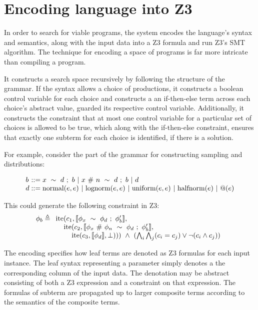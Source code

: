 \documentclass[letterpaper]{llncs}
\begin{document}
\section{Encoding language into Z3}
In order to search for viable programs, the system encodes the language's syntax and semantics, 
along with the input data into a Z3 formula and run Z3's SMT algorithm.
The technique for encoding a space of programs is far more intricate than compiling a program.

It constructs a search space recursively by following the structure of the grammar. 
If the syntax allows a choice of productions, it constructs a boolean control variable for each choice
and constructs a an if-then-else term across each choice's abstract value, guarded its respective control variable. 
Additionally, it constructs the constraint that at most one control variable for a particular set of choices    
is allowed to be true, which along with the if-then-else constraint, ensures
that exactly one subterm for each choice is identified, if there is a solution.  

For example, consider the part of the grammar for constructing sampling and distributions:

\[
  \begin{array}{l @{} l}
    b &{} ::= x\ \sim\ d\ ;\ b \ |\ x\ \#\ n\ \sim\ d\ ;\ b \ |\ d \\ 
    d &{} ::= 
        \text{normal}(e, e) \ |\ 
        \text{lognorm}(e, e) \ |\ 
        \text{uniform}(e, e) \ |\ 
        \text{halfnorm}(e) \ |\ 
        @(e) \\ 
  \end{array}
\]

This could generate the following constraint in Z3:
\[
  \phi_b \triangleq
  \begin{array}[t]{l}
  \text{ite}(c_1, \llbracket \phi_x\ \sim\ \phi_d\ ;\ \phi_b'  \rrbracket, \\
    \hspace{4mm}\text{ite}(c_2, \llbracket \phi_x\ \#\ \phi_n\ \sim\ \phi_d\ ;\ \phi_b' \rrbracket, \\
        \hspace{8mm}\text{ite}(c_3, \llbracket \phi_d \rrbracket, \bot)))
  \ \wedge\ (\bigwedge\nolimits_i \bigwedge\nolimits_j (c_i = c_j) \vee \neg (c_i \wedge c_j) )
  \end{array}
\]


The encoding specifies how leaf terms are denoted as Z3 formulas for each input instance.
The leaf syntax representing a parameter simply denotes a the corresponding column of the input data. 
The denotation may be abstract consisting of both a Z3 expression and a constraint on that expression. 
The formulas of subterm are propagated up to larger composite terms according to the semantics of 
the composite terms.
\end{document}
